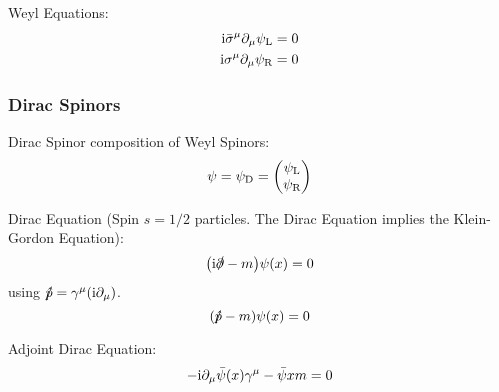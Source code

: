 			\noindent
			Weyl Equations:
			\begin{equation}
				\begin{aligned}
					\mathrm{i} \bar{\sigma}^\mu \partial_\mu \psi_\text{L} &= 0 \\
					\mathrm{i} \sigma^\mu \partial_\mu \psi_\text{R} &= 0 \\
				\end{aligned}
			\end{equation}
			
		\subsubsection{Dirac Spinors}
			Dirac Spinor composition of Weyl Spinors:
			\begin{equation}
				\psi = \psi_\text{D} = \mqty(\psi_\text{L} \\ \psi_\text{R})
			\end{equation}
			
			\noindent
			Dirac Equation (Spin $s=1/2$ particles. The Dirac Equation implies the Klein-Gordon Equation):
			\begin{equation}
				\qty(\mathrm{i}\slashed{\partial} - m ) \psi\qty(x) = 0
			\end{equation}
			using $\slashed{\hat{p}} = \gamma^\mu(\mathrm{i}\partial_\mu)$.
			\begin{equation}
				\qty(\slashed{\hat{p}} - m) \psi\qty(x) = 0
			\end{equation}

			\noindent
			Adjoint Dirac Equation:
			\begin{equation}
				-\mathrm{i} \partial_\mu \bar{\psi}(x)\gamma^\mu-\bar\psi{x}m = 0
			\end{equation}

